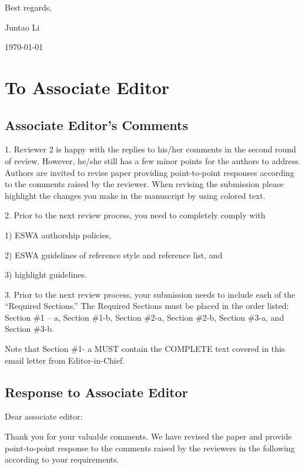 \documentclass[12pt, review]{elsarticle}
\newcounter{reviewer}
\newcounter{point}[reviewer]
\def\mydate{\today} %
\begin{document}
\noindent Best regards,

\noindent Juntao Li

\noindent \mydate

\section{To Associate Editor}
\subsection{Associate Editor’s Comments}
1. Reviewer 2 is happy with the replies to his/her comments in the second round of review. However, he/she still has a few minor points for the authors to address. Authors are invited to revise paper providing point-to-point responses according to the comments raised by the reviewer. When revising the submission please highlight the changes you make in the manuscript by using colored text.

2. Prior to the next review process, you need to completely comply with

1) ESWA authorship policies,

2) ESWA guidelines of reference style and reference list, and

3) highlight guidelines.

3. Prior to the next review process, your submission needs to include each of the “Required Sections.” The Required Sections must be placed in the order listed: Section \#1 – a, Section \#1-b, Section \#2-a, Section \#2-b, Section \#3-a, and Section \#3-b.   

Note that Section \#1- a MUST contain the COMPLETE text covered in this email letter from Editor-in-Chief.



\subsection{Response to Associate Editor}
\noindent Dear associate editor:

Thank you for your valuable comments. We have revised the paper and provide point-to-point response to the comments raised by the reviewers in the following according to your requirements.
\end{document}
